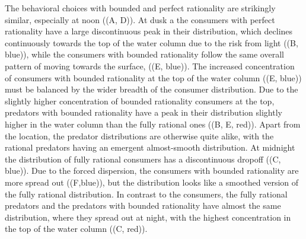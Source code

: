 The behavioral choices with bounded and perfect rationality are strikingly similar, especially at noon ((A, D)). At dusk a the consumers with perfect rationality have a large discontinuous peak in their distribution, which declines continuously towards the top of the water column due to the risk from light ((B, blue)), while the consumers with bounded rationality follow the same overall pattern of moving towards the surface, ((E, blue)). The increased concentration of consumers with bounded rationality at the top of the water column ((E, blue)) must be balanced by the wider breadth of the consumer distribution. Due to the slightly higher concentration of bounded rationality consumers at the top, predators with bounded rationality have a peak in their distribution slightly higher in the water column than the fully rational ones ((B, E, red)). Apart from the location, the predator distributions are otherwise quite alike, with the rational predators having an emergent almost-smooth distribution.
At midnight the distribution of fully rational consumers has a discontinuous dropoff ((C, blue)). Due to the forced dispersion, the consumers with bounded rationality are more spread out ((F,blue)), but the distribution looks like a smoothed version of the fully rational distribution.
In contrast to the consumers, the fully rational predators and the predators with bounded rationality have almost the same distribution, where they spread out at night, with the highest concentration in the top of the water column ((C, red)).





